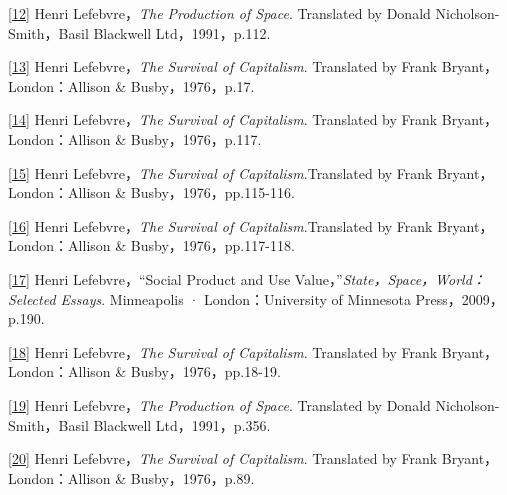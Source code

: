 \documentclass[UTF8, fontset = sourcesans, a4paper, oneside, zihao =
-4, scheme=chinese, no-math, space=true]{ctexbook}
\begin{document}
\protect\hypertarget{part0008_split_003.htmlux5cux23m12}{}{}\protect\hyperlink{part0008_split_001.htmlux5cux23w12}{{[}12{]}}
Henri Lefebvre，\emph{The Production of Space}. Translated by Donald
Nicholson-Smith，Basil Blackwell Ltd，1991，p.112.

\protect\hypertarget{part0008_split_003.htmlux5cux23m13}{}{}\protect\hyperlink{part0008_split_001.htmlux5cux23w13}{{[}13{]}}
Henri Lefebvre，\emph{The Survival of Capitalism}. Translated by Frank
Bryant，London：Allison \& Busby，1976，p.17.

\protect\hypertarget{part0008_split_003.htmlux5cux23m14}{}{}\protect\hyperlink{part0008_split_001.htmlux5cux23w14}{{[}14{]}}
Henri Lefebvre，\emph{The Survival of Capitalism}. Translated by Frank
Bryant，London：Allison \& Busby，1976，p.117.

\protect\hypertarget{part0008_split_003.htmlux5cux23m15}{}{}\protect\hyperlink{part0008_split_001.htmlux5cux23w15}{{[}15{]}}
Henri Lefebvre，\emph{The Survival of Capitalism}.Translated by Frank
Bryant，London：Allison \& Busby，1976，pp.115-116.

\protect\hypertarget{part0008_split_003.htmlux5cux23m16}{}{}\protect\hyperlink{part0008_split_001.htmlux5cux23w16}{{[}16{]}}
Henri Lefebvre，\emph{The Survival of Capitalism}.Translated by Frank
Bryant，London：Allison \& Busby，1976，pp.117-118.

\protect\hypertarget{part0008_split_003.htmlux5cux23m17}{}{}\protect\hyperlink{part0008_split_001.htmlux5cux23w17}{{[}17{]}}
Henri Lefebvre，``Social Product and Use
Value，''\emph{State，Space，World：Selected Essays}. Minneapolis ·
London：University of Minnesota Press，2009，p.190.

\protect\hypertarget{part0008_split_003.htmlux5cux23m18}{}{}\protect\hyperlink{part0008_split_001.htmlux5cux23w18}{{[}18{]}}
Henri Lefebvre，\emph{The Survival of Capitalism}. Translated by Frank
Bryant，London：Allison \& Busby，1976，pp.18-19.

\protect\hypertarget{part0008_split_003.htmlux5cux23m19}{}{}\protect\hyperlink{part0008_split_001.htmlux5cux23w19}{{[}19{]}}
Henri Lefebvre，\emph{The Production of Space}. Translated by Donald
Nicholson-Smith，Basil Blackwell Ltd，1991，p.356.

\protect\hypertarget{part0008_split_003.htmlux5cux23m20}{}{}\protect\hyperlink{part0008_split_002.htmlux5cux23w20}{{[}20{]}}
Henri Lefebvre，\emph{The Survival of Capitalism}. Translated by Frank
Bryant，London：Allison \& Busby，1976，p.89.
\end{document}
